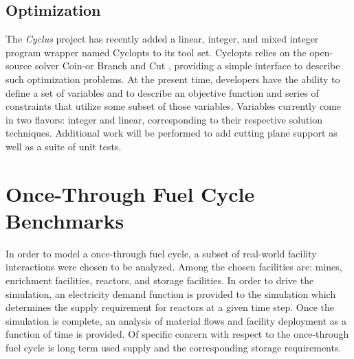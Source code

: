 \documentclass{anstrans}
\begin{document}
\subsection{Optimization}
The \emph{Cyclus} project has recently added a linear, integer, and mixed integer program wrapper named Cyclopts \cite{cyclopts2012} to its tool set. Cyclopts relies on the
open-source solver Coin-or Branch and Cut \cite{coinCBC}, providing a simple interface to describe such optimization problems. At the present time,
developers have the ability to define a set of variables and to describe an objective function and series of constraints that utilize some subset
of those variables. Variables currently come in two flavors: integer and linear, corresponding to their respective solution techniques. Additional
work will be performed to add cutting plane support as well as a suite of unit tests.
\section{Once-Through Fuel Cycle Benchmarks}
In order to model a once-through fuel cycle, a subset of real-world facility interactions were chosen to be analyzed. Among the chosen facilities are:
mines, enrichment facilities, reactors, and storage facilities. In order to drive the simulation, an electricity demand function is provided to the 
simulation which determines the supply requirement for reactors at a given time step. Once the simulation is complete, an analysis of material
flows and facility deployment as a function of time is provided. Of specific concern with respect to the once-through fuel cycle is long term used
supply and the corresponding storage requirements.
\end{document}
